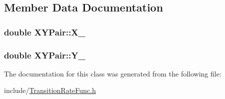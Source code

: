 \subsection{Member Data Documentation}
\hypertarget{classXYPair_a63810458e4feee03a846503f3d5aa9f2}{
\subsubsection[{X\-\_\-}]{\setlength{\rightskip}{0pt plus 5cm}double X\-Y\-Pair\-::\-X\-\_\-}}\label{classXYPair_a63810458e4feee03a846503f3d5aa9f2}
\hypertarget{classXYPair_aae7e2876bca240d1d21d5deedb3cba3e}{
\subsubsection[{Y\-\_\-}]{\setlength{\rightskip}{0pt plus 5cm}double X\-Y\-Pair\-::\-Y\-\_\-}}\label{classXYPair_aae7e2876bca240d1d21d5deedb3cba3e}


The documentation for this class was generated from the following file\-:\begin{DoxyCompactItemize}
\item 
include/\hyperlink{TransitionRateFunc_8h}{Transition\-Rate\-Func.\-h}\end{DoxyCompactItemize}
